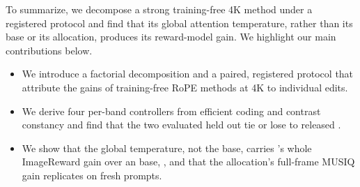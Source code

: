 To summarize, we decompose a strong training-free 4K method under a registered protocol and find that its global attention temperature, rather than its base or its allocation, produces its reward-model gain. We highlight our main contributions below.
\begin{itemize}
\item We introduce a factorial decomposition and a paired, registered protocol that attribute the gains of training-free RoPE methods at 4K to individual edits.
\item We derive four per-band controllers from efficient coding and contrast constancy and find that the two evaluated held out tie or lose to released \sega.
\item We show that the global temperature, not the base, carries \sega's whole ImageReward gain over an \ntk{} base,  , and that the allocation's full-frame MUSIQ gain replicates on fresh prompts.
\end{itemize}
